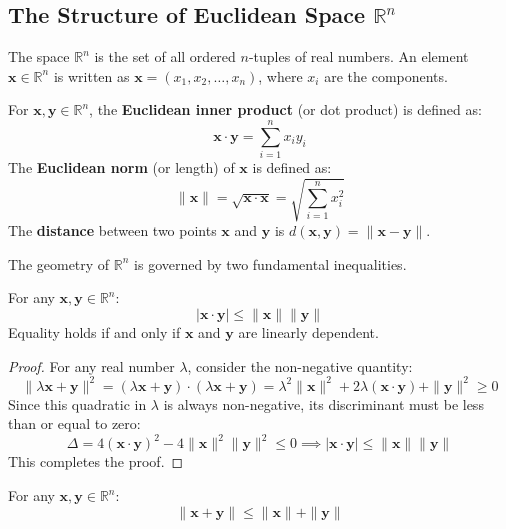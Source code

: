 \subsection{The Structure of Euclidean Space \texorpdfstring{$\mathbb{R}^n$}{R n}}

The space $\mathbb{R}^n$ is the set of all ordered $n$-tuples of real numbers. An element $\mathbf{x} \in \mathbb{R}^n$ is written as $\mathbf{x} = (x_1, x_2, \dots, x_n)$, where $x_i$ are the components.

\begin{definition}
For $\mathbf{x}, \mathbf{y} \in \mathbb{R}^n$, the \textbf{Euclidean inner product} (or dot product) is defined as:
\[ \mathbf{x} \cdot \mathbf{y} = \sum_{i=1}^n x_i y_i \]
The \textbf{Euclidean norm} (or length) of $\mathbf{x}$ is defined as:
\[ \|\mathbf{x}\| = \sqrt{\mathbf{x} \cdot \mathbf{x}} = \sqrt{\sum_{i=1}^n x_i^2} \]
The \textbf{distance} between two points $\mathbf{x}$ and $\mathbf{y}$ is $d(\mathbf{x}, \mathbf{y}) = \|\mathbf{x} - \mathbf{y}\|$.
\end{definition}

The geometry of $\mathbb{R}^n$ is governed by two fundamental inequalities.

\begin{theorem}
For any $\mathbf{x}, \mathbf{y} \in \mathbb{R}^n$:
\[ |\mathbf{x} \cdot \mathbf{y}| \le \|\mathbf{x}\| \|\mathbf{y}\| \]
Equality holds if and only if $\mathbf{x}$ and $\mathbf{y}$ are linearly dependent.
\end{theorem}

\begin{proof}
For any real number $\lambda$, consider the non-negative quantity:
\[ \|\lambda \mathbf{x} + \mathbf{y}\|^2 = (\lambda \mathbf{x} + \mathbf{y}) \cdot (\lambda \mathbf{x} + \mathbf{y}) = \lambda^2 \|\mathbf{x}\|^2 + 2\lambda (\mathbf{x} \cdot \mathbf{y}) + \|\mathbf{y}\|^2 \ge 0 \]
Since this quadratic in $\lambda$ is always non-negative, its discriminant must be less than or equal to zero:
\[ \Delta = 4(\mathbf{x} \cdot \mathbf{y})^2 - 4\|\mathbf{x}\|^2 \|\mathbf{y}\|^2 \le 0 \implies |\mathbf{x} \cdot \mathbf{y}| \le \|\mathbf{x}\| \|\mathbf{y}\| \]
This completes the proof.
\end{proof}

\begin{theorem}
For any $\mathbf{x}, \mathbf{y} \in \mathbb{R}^n$:
\[ \|\mathbf{x} + \mathbf{y}\| \le \|\mathbf{x}\| + \|\mathbf{y}\| \]
\end{theorem}

